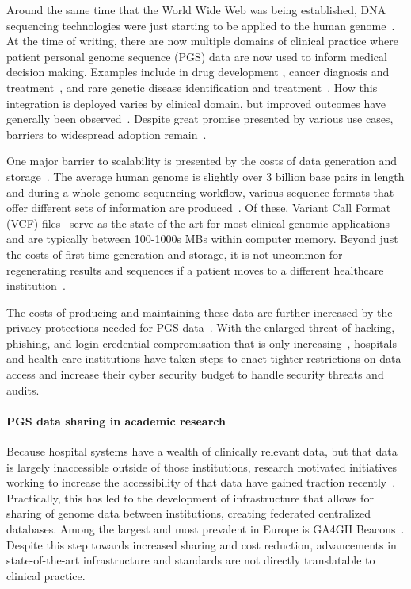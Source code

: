 \documentclass[a4paper,11pt]{article}
\begin{document}
\begin{refsection}
Around the same time that the World Wide Web was being established, DNA sequencing technologies were just starting to be applied to the human genome~\cite{hood_1987}.
At the time of writing, there are now multiple domains of clinical practice where patient personal genome sequence (PGS) data are now used to inform medical decision making. 
Examples include in drug development \cite{ko_new_2022}, cancer diagnosis and treatment~\cite{mcleod_cancer_2013}, and rare genetic disease identification and treatment~\cite{souche_recommendations_2022}.
How this integration is deployed varies by clinical domain, but improved outcomes have generally been observed~\cite{mathur_personalized_2017}.
Despite great promise presented by various use cases, barriers to widespread adoption remain~\cite{stefanicka-wojtas_barriers_2023}.

One major barrier to scalability is presented by the costs of data generation and storage~\cite{genomics_cost_2023}.
The average human genome is slightly over 3 billion base pairs in length and during a whole genome sequencing workflow, various sequence formats that offer different sets of information are produced~\cite{bagger_whole_2024}.
Of these, Variant Call Format (VCF) files~\cite{danecek_variant_2011} serve as the state-of-the-art for most clinical genomic applications and are typically between 100-1000s MBs within computer memory. 
Beyond just the costs of first time generation and storage, it is not uncommon for regenerating results and sequences if a patient moves to a different healthcare institution~\cite{that one citiation}.

The costs of producing and maintaining these data are further increased by the privacy protections needed for PGS data~\cite{GDPR_2016}.
With the enlarged threat of hacking, phishing, and login credential compromisation that is only increasing~\cite{noauthor_ransomware_nodate}, hospitals and health care institutions have taken steps to enact tighter restrictions on data access and increase their cyber security budget to handle security threats and audits.


\paragraph{PGS data sharing in academic research}
Because hospital systems have a wealth of clinically relevant data, but that data is largely inaccessible outside of those institutions, research motivated initiatives working to increase the accessibility of that data have gained traction recently~\cite{data_sharing_2019}.
Practically, this has led to the development of infrastructure that allows for sharing of genome data between institutions, creating federated centralized databases. 
Among the largest and most prevalent in Europe is GA4GH Beacons~\cite{rambla_beacon_2022}. 
Despite this step towards increased sharing and cost reduction, advancements in state-of-the-art infrastructure and standards are not directly translatable to clinical practice. 



\end{refsection}
\end{document}
